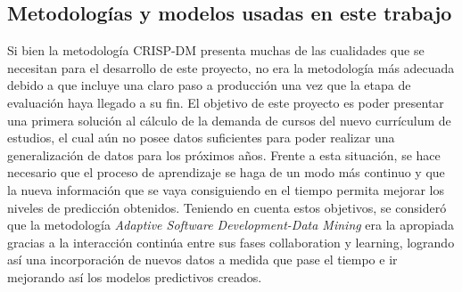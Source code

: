 \subsection{Metodologías y modelos usadas en este trabajo \label{sec:problem_categories}}

Si bien la metodología CRISP-DM presenta muchas de las cualidades que se necesitan para el desarrollo de este proyecto, no era la metodología más adecuada debido  a que incluye una claro paso a producción una vez que la etapa de evaluación haya llegado a su fin. El objetivo de este proyecto es poder presentar una primera solución al cálculo de la demanda de cursos del nuevo currículum de estudios, el cual aún no posee datos suficientes para poder realizar una generalización de datos para los próximos años. Frente a esta situación, se hace necesario que el proceso de aprendizaje se haga de un modo más continuo y que la nueva información que se vaya consiguiendo en el tiempo permita mejorar los niveles de predicción obtenidos. Teniendo en cuenta estos objetivos, se consideró que la metodología \textit{Adaptive Software Development-Data Mining} era la apropiada  gracias a la interacción continúa entre sus fases collaboration y learning, logrando así una incorporación de nuevos datos a medida que pase el tiempo e ir mejorando así los modelos predictivos creados.
